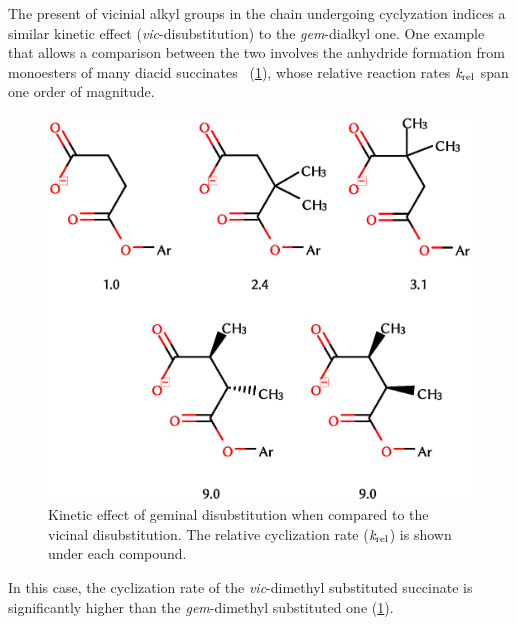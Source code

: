 The present of vicinial alkyl groups in the chain undergoing cyclyzation
indices a similar kinetic effect (\emph{vic}-disubstitution)
to the \emph{gem}-dialkyl one.
One example that allows a comparison between the two
involves the anhydride formation from monoesters of many diacid
succinates~\cite{Kirby_1980,Bruice_1960a,Bruice_1960b,Bruice_1965,Lightstone_1994}
(\cref{fig:succinatos}), whose relative reaction rates
$\emph{k}_\text{rel}$ span one order of magnitude.
%
\begin{figure}[hbtp]
	\centering
	\includegraphics[width=.75\textwidth]{figures/succinatos}
	\caption[Kinetic effects of geminal and vicinal disubstitutions.]{
		Kinetic effect of geminal disubstitution when compared to the vicinal disubstitution.
		The relative cyclization rate ($\emph{k}_\text{rel}$)
		is shown under each compound.}\label{fig:succinatos}
\end{figure}
%
In this case, the
cyclization rate
of the
\emph{vic}-dimethyl substituted
succinate
is significantly higher than the \emph{gem}-dimethyl substituted one
(\cref{fig:succinatos}).

